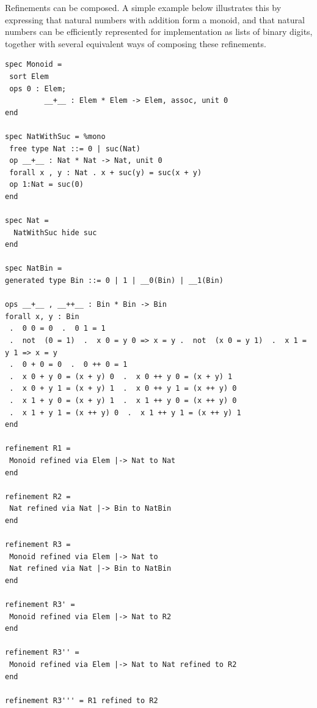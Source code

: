 \documentclass[10pt,fleqn,final]{scrreprt}
\newenvironment{definitions}[0]{\medskip }{}
\begin{document}
\begin{definitions}
\medskip

Refinements can be composed. A simple example below illustrates this
by expressing that natural numbers with addition form a monoid, and
that natural numbers can be efficiently represented for implementation
as lists of binary digits, together with several equivalent ways of
composing these refinements.

\begin{lstlisting}[basicstyle=\ttfamily\footnotesize,language=dolText,alsolanguage=CASL,escapechar=@,mathescape]	
spec Monoid =
 sort Elem
 ops 0 : Elem;
         __+__ : Elem * Elem -> Elem, assoc, unit 0
end

spec NatWithSuc = %mono
 free type Nat ::= 0 | suc(Nat)
 op __+__ : Nat * Nat -> Nat, unit 0 
 forall x , y : Nat . x + suc(y) = suc(x + y)
 op 1:Nat = suc(0)
end

spec Nat =
  NatWithSuc hide suc
end

spec NatBin =
generated type Bin ::= 0 | 1 | __0(Bin) | __1(Bin)

ops __+__ , __++__ : Bin * Bin -> Bin 
forall x, y : Bin 
 .  0 0 = 0  .  0 1 = 1
 .  not  (0 = 1)  .  x 0 = y 0 => x = y .  not  (x 0 = y 1)  .  x 1 = y 1 => x = y
 .  0 + 0 = 0  .  0 ++ 0 = 1 
 .  x 0 + y 0 = (x + y) 0  .  x 0 ++ y 0 = (x + y) 1
 .  x 0 + y 1 = (x + y) 1  .  x 0 ++ y 1 = (x ++ y) 0 
 .  x 1 + y 0 = (x + y) 1  .  x 1 ++ y 0 = (x ++ y) 0
 .  x 1 + y 1 = (x ++ y) 0  .  x 1 ++ y 1 = (x ++ y) 1 
end

refinement R1 =
 Monoid refined via Elem |-> Nat to Nat
end

refinement R2 =
 Nat refined via Nat |-> Bin to NatBin
end

refinement R3 =
 Monoid refined via Elem |-> Nat to
 Nat refined via Nat |-> Bin to NatBin
end

refinement R3' =
 Monoid refined via Elem |-> Nat to R2
end

refinement R3'' = 
 Monoid refined via Elem |-> Nat to Nat refined to R2
end

refinement R3''' = R1 refined to R2

\end{lstlisting}


\end{definitions}
\end{document}
